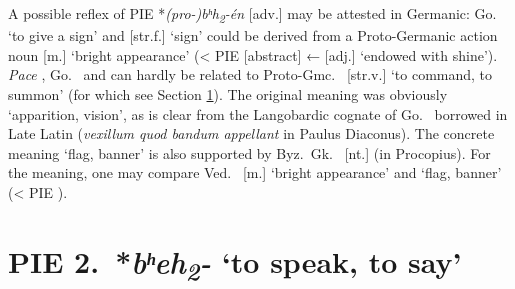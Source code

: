 \documentclass[output=paper,colorlinks,citecolor=brown]{langscibook}
\begin{document}
A possible reflex of PIE *\textit{(pro-)bʰh\textsubscript{2}}\textit{-én}  [adv.] may be attested in Germanic: Go.\  ‘to give a sign’ and  [str.f.] ‘sign’ could be derived from a Proto-Germanic action noun  [m.] ‘bright appearance’ (< PIE  [abstract] ←  [adj.] ‘endowed with shine’). \textit{Pace} , Go.\  and  can hardly be related to Proto-Gmc.\  [str.v.] ‘to command, to summon’ (for which see Section \ref{sec:4}). The original meaning was obviously ‘apparition, vision’, as is clear from the Langobardic cognate of Go.\  borrowed in Late Latin (\textit{vexillum quod bandum appellant} in Paulus Diaconus). The concrete meaning ‘flag, banner’ is also supported by Byz.\ Gk.\  [nt.] (in Procopius). For the meaning, one may compare Ved.\  [m.] ‘bright appearance’ and ‘flag, banner’ (< PIE ).

\section{PIE 2.\ *\textit{bʰeh\textsubscript{2}}\textit{-} ‘to speak, to say’}
\label{sec:4}
\end{document}
